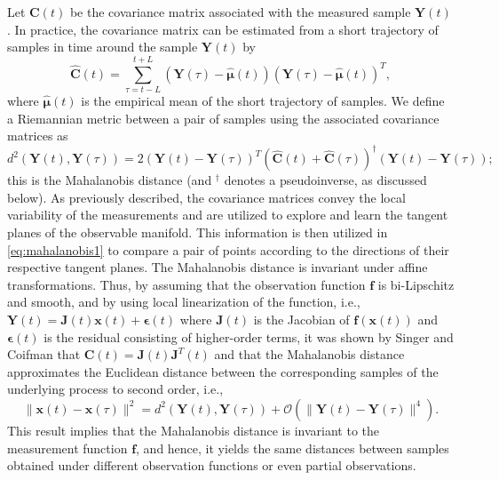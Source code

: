 Let $\mathbf{C}(t)$ be the covariance matrix associated with the measured sample $\mathbf{Y}(t)$. In practice, the covariance matrix can be estimated from a short trajectory of samples in time around the sample $\mathbf{Y}(t)$ by
\begin{equation}
	\widehat{\mathbf{C}}(t) = \sum \limits _{\tau = t-L}^{t+L} (\mathbf{Y}(\tau) - \widehat{\boldsymbol{\mu}}(t))(\mathbf{Y}(\tau) - \widehat{\boldsymbol{\mu}}(t))^T,
	\label{eq:cov}
\end{equation}
where $\widehat{\boldsymbol{\mu}}(t)$ is the empirical mean of the short trajectory of samples.
%
We define a Riemannian metric between a pair of samples using the associated covariance matrices as
\begin{equation}
	d^2(\mathbf{Y}(t), \mathbf{Y}(\tau)) = 2 (\mathbf{Y}(t) - \mathbf{Y}(\tau))^T(\widehat{\mathbf{C}}(t) + \widehat{\mathbf{C}}(\tau))^{\dagger}(\mathbf{Y}(t) - \mathbf{Y}(\tau));
	\label{eq:mahalanobis1}
\end{equation}
this is the Mahalanobis distance (and $^{\dagger}$ denotes a pseudoinverse, as discussed below).
%
As previously described, the covariance matrices convey the local variability of the measurements and are utilized to explore and learn the tangent planes of the observable manifold.
%
This information is then utilized in \eqref{eq:mahalanobis1} to compare a pair of points according to the directions of their respective tangent planes.
%
The Mahalanobis distance is invariant under affine transformations.
%
Thus, by assuming that the observation function $\mathbf{f}$ is bi-Lipschitz and smooth, and by using local linearization of the function, i.e., $\mathbf{Y}(t) = \mathbf{J}(t) \mathbf{x}(t) + \boldsymbol{\epsilon}(t)$ where $\mathbf{J}(t)$ is the Jacobian of $\mathbf{f}(\mathbf{x}(t))$ and $\boldsymbol{\epsilon}(t)$ is the residual consisting of higher-order terms, it was shown by Singer and Coifman \cite{singer2008non} that $\mathbf{C}(t) = \mathbf{J}(t)\mathbf{J}^T(t)$ and that the Mahalanobis distance approximates the Euclidean distance between the corresponding samples of the underlying process to second order, i.e.,
\begin{equation}
	\| \mathbf{x}(t) - \mathbf{x}(\tau) \|^2 = d^2(\mathbf{Y}(t), \mathbf{Y}(\tau)) + \mathcal{O}(\| \mathbf{Y}(t) - \mathbf{Y}(\tau)\|^4).
\end{equation}
%
This result implies that the Mahalanobis distance is invariant to the measurement function $\mathbf{f}$, and hence,
it yields the same distances between samples obtained under different observation functions or even partial observations.
